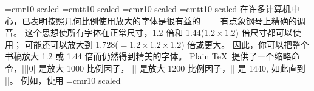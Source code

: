 \font\onerm=cmr10 scaled
\font\onett=cmtt10 scaled
\font\tworm=cmr10 scaled
\font\twott=cmtt10 scaled
\danger 在许多计算机中心，已表明按照几何比例使用放大的字体是很有益的——%
有点象钢琴上精确的调\hbox{音。}%
这个思想使所有字体在正常尺寸，1.2 倍和 1.44($1.2\times1.2$) 倍尺寸都可以使用；
可能还可以放大到 1.728($=1.2\times1.2\times1.2$) 倍或更大。%
因此，你可以把整个书稿放大 1.2 或 1.44 倍而仍然得到精美的\hbox{字体。}%
Plain \TeX\ 提供了一个缩略命令，|\magstep||0| 是放大 1000 比例因子，
|| 是放大 1200 比例因子，|| 是 1440, 如此直到 ||。%
例如，使用
\begintt
\font\bigtenrm=cmr10 scaled
